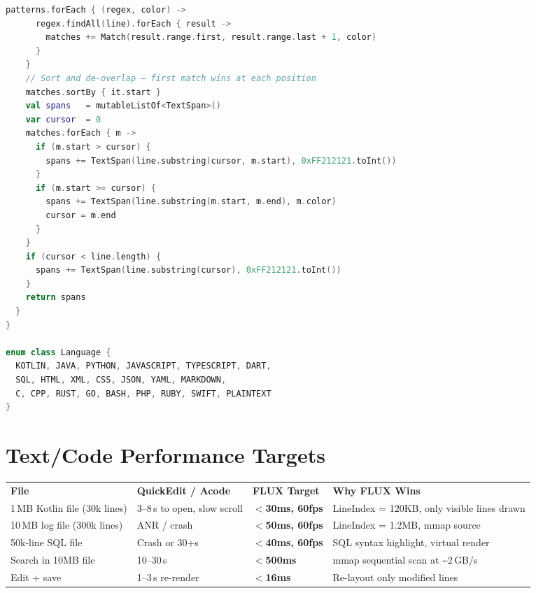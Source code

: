 \documentclass[12pt,a4paper]{report}
\newcommand{\ra}[1]{\renewcommand{\arraystretch}{#1}}
\newcommand{\TH}[1]{\rowcolor{P1}\color{white}\bfseries #1}
\newcommand{\PB}{\newpage}
\begin{document}
\begin{lstlisting}[language=Kotlin,caption={Syntax highlighter — no AST, pure regex spans}]
    patterns.forEach { (regex, color) ->
      regex.findAll(line).forEach { result ->
        matches += Match(result.range.first, result.range.last + 1, color)
      }
    }
    // Sort and de-overlap — first match wins at each position
    matches.sortBy { it.start }
    val spans   = mutableListOf<TextSpan>()
    var cursor  = 0
    matches.forEach { m ->
      if (m.start > cursor) {
        spans += TextSpan(line.substring(cursor, m.start), 0xFF212121.toInt())
      }
      if (m.start >= cursor) {
        spans += TextSpan(line.substring(m.start, m.end), m.color)
        cursor = m.end
      }
    }
    if (cursor < line.length) {
      spans += TextSpan(line.substring(cursor), 0xFF212121.toInt())
    }
    return spans
  }
}

enum class Language {
  KOTLIN, JAVA, PYTHON, JAVASCRIPT, TYPESCRIPT, DART,
  SQL, HTML, XML, CSS, JSON, YAML, MARKDOWN,
  C, CPP, RUST, GO, BASH, PHP, RUBY, SWIFT, PLAINTEXT
}
\end{lstlisting}

\section{Text/Code Performance Targets}

\begin{center}\ra{1.35}
\begin{tabular}{L{4.4cm} C{2.8cm} C{2.2cm} L{4.4cm}}
\TH{File} & \TH{QuickEdit / Acode} & \TH{FLUX Target} & \TH{Why FLUX Wins} \\
 1\,MB Kotlin file (30k lines) & 3--8\,s to open, slow scroll & \textbf{$<$30ms, 60fps} & LineIndex = 120KB, only visible lines drawn \\
 10\,MB log file (300k lines) & ANR / crash & \textbf{$<$50ms, 60fps} & LineIndex = 1.2MB, mmap source \\
 50k-line SQL file & Crash or 30+s & \textbf{$<$40ms, 60fps} & SQL syntax highlight, virtual render \\
 Search in 10MB file & 10--30\,s & \textbf{$<$500ms} & mmap sequential scan at \textasciitilde 2\,GB/s \\
 Edit + save & 1--3\,s re-render & \textbf{$<$16ms} & Re-layout only modified lines \\
\end{tabular}
\end{center}

\PB

\end{document}
